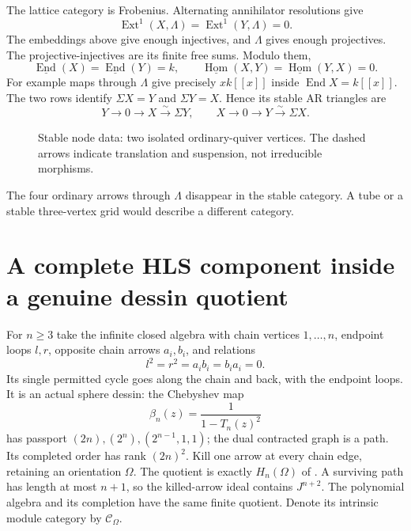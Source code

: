 \documentclass[11pt,oneside,openany]{book}
\theoremstyle{definition}\newtheorem{definition}[theorem]{Definition}
\theoremstyle{remark}\newtheorem{remark}[theorem]{Remark}
\begin{document}
The lattice category is Frobenius. Alternating annihilator resolutions give
\[
 \operatorname{Ext}^1(X,\Lambda)=\operatorname{Ext}^1(Y,\Lambda)=0.
\]
The embeddings above give enough injectives, and $\Lambda$ gives enough
projectives. The projective-injectives are its finite free sums. Modulo them,
\[
 \underline{\operatorname{End}}(X)=
 \underline{\operatorname{End}}(Y)=k,\qquad
 \underline{\operatorname{Hom}}(X,Y)=
 \underline{\operatorname{Hom}}(Y,X)=0.
\]
For example maps through $\Lambda$ give precisely $xk[[x]]$ inside
$\operatorname{End}X=k[[x]]$. The two rows identify
$\Sigma X=Y$ and $\Sigma Y=X$. Hence its stable AR triangles are
\[
 Y\to0\to X\xrightarrow{\sim}\Sigma Y,
 \qquad X\to0\to Y\xrightarrow{\sim}\Sigma X.
\]
\begin{figure}[htbp]\centering
{}
\caption{Stable node data: two isolated ordinary-quiver vertices. The dashed
arrows indicate translation and suspension, not irreducible morphisms.}
\end{figure}
The four ordinary arrows through $\Lambda$ disappear in the stable category.
A tube or a stable three-vertex grid would describe a different category.

\section[An HLS component in a dessin quotient]{A complete HLS component inside a genuine dessin quotient}
For $n\ge3$ take the infinite closed algebra with chain vertices $1,\ldots,n$,
endpoint loops $l,r$, opposite chain arrows $a_i,b_i$, and relations
\[
 l^2=r^2=a_ib_i=b_ia_i=0.
\]
Its single permitted cycle goes along the chain and back, with the endpoint
loops. It is an actual sphere dessin: the Chebyshev map
\[
 \beta_n(z)=\frac{1}{1-T_n(z)^2}
\]
has passport $(2n),(2^n),(2^{n-1},1,1)$; the dual contracted graph is a path.
Its completed order has rank $(2n)^2$. Kill one arrow at every chain edge,
retaining an orientation $\Omega$. The quotient is exactly $H_n(\Omega)$ of
\cite{ARBHLS}. A surviving path has length at most $n+1$, so the killed-arrow
ideal contains $J^{n+2}$. The polynomial algebra and its completion have the
same finite quotient. Denote its intrinsic module category by $\mathcal C_\Omega$.
\end{document}
